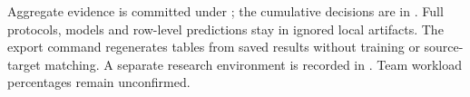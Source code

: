 Aggregate evidence is committed under ; the cumulative decisions are in . Full protocols, models and row-level predictions stay in ignored local artifacts. The export command  regenerates tables from saved results without training or source-target matching. A separate research environment is recorded in . Team workload percentages remain unconfirmed.
